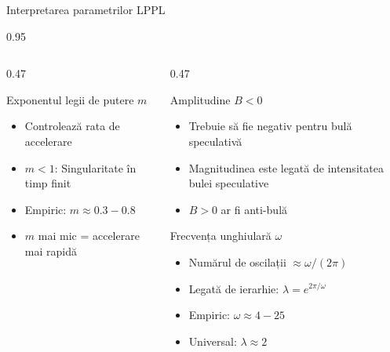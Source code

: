 \documentclass[9pt, aspectratio=169, t]{beamer}
\begin{document}
\begin{frame}{Interpretarea parametrilor LPPL}
\begin{cminipage}{0.95\textwidth}
{\begin{columns}[T]
\begin{column}{0.47\textwidth}
            \begin{exampleblock}{Exponentul legii de putere $m$}
                \begin{itemize}\setlength{\itemsep}{0pt}
                    \item Controlează rata de accelerare
                    \item $m < 1$: Singularitate în timp finit
                    \item Empiric: $m \approx 0.3 - 0.8$
                    \item $m$ mai mic = accelerare mai rapidă
                \end{itemize}
            \end{exampleblock}
        \end{column}
        \begin{column}{0.47\textwidth}
            \begin{alertblock}{Amplitudine $B < 0$}
                \begin{itemize}\setlength{\itemsep}{0pt}
                    \item Trebuie să fie negativ pentru bulă speculativă
                    \item Magnitudinea este legată de intensitatea bulei speculative
                    \item $B > 0$ ar fi anti-bulă
                \end{itemize}
            \end{alertblock}

            \begin{block}{Frecvența unghiulară $\omega$}
                \begin{itemize}\setlength{\itemsep}{0pt}
                    \item Numărul de oscilații $\approx \omega/(2\pi)$
                    \item Legată de ierarhie: $\lambda = e^{2\pi/\omega}$
                    \item Empiric: $\omega \approx 4 - 25$
                    \item Universal: $\lambda \approx 2$
                \end{itemize}
            \end{block}
        \end{column}
    \end{columns}
    }
    \end{cminipage}
\end{frame}
\end{document}
